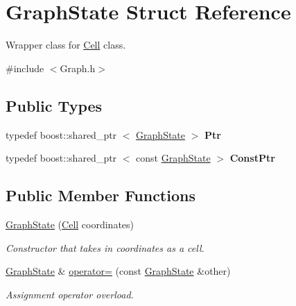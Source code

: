 \hypertarget{struct_graph_state}{\section{\-Graph\-State \-Struct \-Reference}
\label{struct_graph_state}
}


\-Wrapper class for \hyperlink{struct_cell}{\-Cell} class.  




{\ttfamily \#include $<$\-Graph.\-h$>$}

\subsection*{\-Public \-Types}
\begin{DoxyCompactItemize}
\item 
\hypertarget{struct_graph_state_af127a4d5f8eb11a26b549872300ffab6}{typedef boost\-::shared\-\_\-ptr\*
$<$ \hyperlink{struct_graph_state}{\-Graph\-State} $>$ {\bfseries \-Ptr}}\label{struct_graph_state_af127a4d5f8eb11a26b549872300ffab6}

\item 
\hypertarget{struct_graph_state_a1d1286a93714fe0f2832482bf27d3fcc}{typedef boost\-::shared\-\_\-ptr\*
$<$ const \hyperlink{struct_graph_state}{\-Graph\-State} $>$ {\bfseries \-Const\-Ptr}}\label{struct_graph_state_a1d1286a93714fe0f2832482bf27d3fcc}

\end{DoxyCompactItemize}
\subsection*{\-Public \-Member \-Functions}
\begin{DoxyCompactItemize}
\item 
\hyperlink{struct_graph_state_adc1780238486cf440e5dff8e17475098}{\-Graph\-State} (\hyperlink{struct_cell}{\-Cell} coordinates)
\begin{DoxyCompactList}\small\item\em \-Constructor that takes in coordinates as a cell. \end{DoxyCompactList}\item 
\hypertarget{struct_graph_state_aa64149fdf50125585ddf76b2b795c73d}{\hyperlink{struct_graph_state}{\-Graph\-State} \& \hyperlink{struct_graph_state_aa64149fdf50125585ddf76b2b795c73d}{operator=} (const \hyperlink{struct_graph_state}{\-Graph\-State} \&other)}\label{struct_graph_state_aa64149fdf50125585ddf76b2b795c73d}

\begin{DoxyCompactList}\small\item\em \-Assignment operator overload. \end{DoxyCompactList}\end{DoxyCompactItemize}
